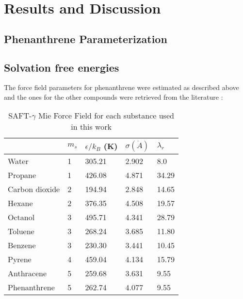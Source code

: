 \chapter{Results and Discussion} %

\label{Chapter5} %

\section{Phenanthrene Parameterization}


\section{Solvation free energies}

The force field parameters for phenanthrene were estimated as described above and the ones for the other compounds were retrieved from the literature \cite{lobanova2016,herdes2015,ervik2016,muller2017}:

\begin{table*}[h]
\center
  \caption{SAFT-$\gamma$ Mie Force Field for each substance used in this work}
  \label{tbl:parameters}
  \begin{tabular}{lllll}
  	\hline
  	               & $m_s$ & $\epsilon/k_{B}$ (K) & $\sigma (\dot{A})$ & $\lambda_r$ \\ \hline
  	Water          & 1     & 305.21               & 2.902              & 8.0         \\
  	Propane        & 1     & 426.08               & 4.871              & 34.29       \\
  	Carbon dioxide & 2     & 194.94               & 2.848              & 14.65       \\
  	Hexane         & 2     & 376.35               & 4.508              & 19.57       \\
  	Octanol        & 3     & 495.71               & 4.341              & 28.79       \\
  	Toluene        & 3     & 268.24               & 3.685              & 11.80       \\
  	Benzene        & 3     & 230.30               & 3.441              & 10.45       \\
  	Pyrene         & 4     & 459.04               & 4.134              & 15.79       \\
  	Anthracene     & 5     & 259.68               & 3.631              & 9.55        \\
  	Phenanthrene   & 5     & 262.74               & 4.077              & 9.55        \\ \hline
  \end{tabular}

\end{table*}


